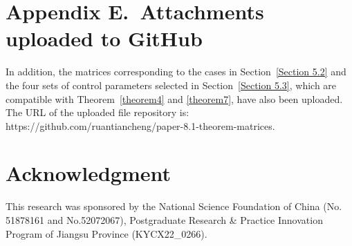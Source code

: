 \documentclass[a4paper]{cas-sc}
\begin{document}
\section*{Appendix E.~Attachments uploaded to GitHub}
\label{AppendixE}

In addition, the matrices corresponding to the cases in Section~\ref{Section 5.2} and the four sets of control parameters selected in Section~\ref{Section 5.3}, which are compatible with Theorem~\ref{theorem4} and \ref{theorem7}, have also been uploaded. The URL of the uploaded file repository is:
https://github.com/ruantiancheng/paper-8.1-theorem-matrices.


\printcredits

\section*{Acknowledgment}

This research was sponsored by the National Science Foundation of China (No. 51878161 and No.52072067), Postgraduate Research \& Practice Innovation Program of Jiangsu Province (KYCX22\_0266).

% 





\end{document}
